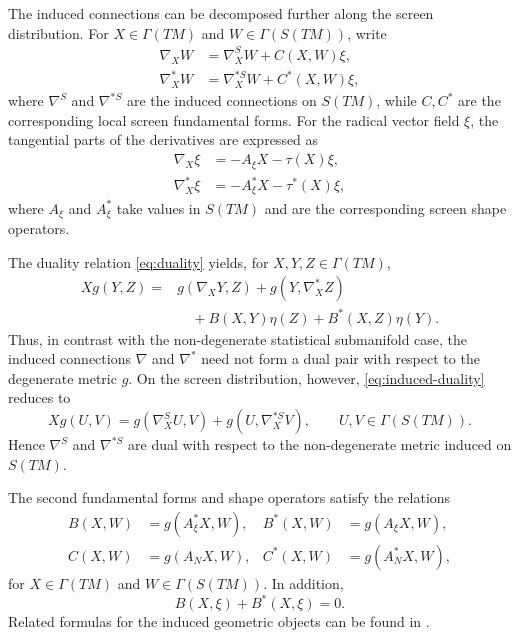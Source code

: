 \documentclass[10pt,a4paper]{amsart}
\begin{document}
The induced connections can be decomposed further along the screen
distribution. For $X\in\Gamma(TM)$ and $W\in\Gamma(S(TM))$, write
\begin{align}
\nabla_{X}W
&=
\nabla^{S}_{X}W+C(X,W)\xi,
\label{eq:screen-gauss}\\
\nabla^{*}_{X}W
&=
\nabla^{*S}_{X}W+C^{*}(X,W)\xi,
\label{eq:screen-gauss-star}
\end{align}
where $\nabla^{S}$ and $\nabla^{*S}$ are the induced connections on $S(TM)$,
while $C,C^{*}$ are the corresponding local screen fundamental forms.
For the radical vector field $\xi$, the tangential parts of the
derivatives are expressed as
\begin{align}
\nabla_{X}\xi
&=
-A_{\xi}X-\tau(X)\xi,
\label{eq:xi-derivative}\\
\nabla^{*}_{X}\xi
&=
-A^{*}_{\xi}X-\tau^{*}(X)\xi,
\label{eq:xi-derivative-star}
\end{align}
where $A_{\xi}$ and $A^{*}_{\xi}$ take values in $S(TM)$ and are the
corresponding screen shape operators.

The duality relation \eqref{eq:duality} yields, for
$X,Y,Z\in\Gamma(TM)$,
\begin{align}
Xg(Y,Z)
={}&
g(\nabla_{X}Y,Z)
+
g(Y,\nabla^{*}_{X}Z) \nonumber\\
&\quad
+B(X,Y)\eta(Z)
+
B^{*}(X,Z)\eta(Y).
\label{eq:induced-duality}
\end{align}
Thus, in contrast with the non-degenerate statistical submanifold case,
the induced connections $\nabla$ and $\nabla^{*}$ need not form a dual
pair with respect to the degenerate metric $g$. On the screen
distribution, however, \eqref{eq:induced-duality} reduces to
\begin{equation}\label{eq:screen-duality}
Xg(U,V)
=
g(\nabla^{S}_{X}U,V)
+
g(U,\nabla^{*S}_{X}V),
\qquad
U,V\in\Gamma(S(TM)).
\end{equation}
Hence $\nabla^{S}$ and $\nabla^{*S}$ are dual with respect to the
non-degenerate metric induced on $S(TM)$.

The second fundamental forms and shape operators satisfy the relations
\begin{align}
B(X,W)
&=
g(A^{*}_{\xi}X,W),
&
B^{*}(X,W)
&=
g(A_{\xi}X,W),
\label{eq:B-shape}\\
C(X,W)
&=
g(A_{N}X,W),
&
C^{*}(X,W)
&=
g(A^{*}_{N}X,W),
\label{eq:C-shape}
\end{align}
for $X\in\Gamma(TM)$ and $W\in\Gamma(S(TM))$. In addition,
\begin{equation}\label{eq:B-xi}
B(X,\xi)+B^{*}(X,\xi)=0.
\end{equation}
Related formulas for the induced geometric objects can be found in
\cite{JainSinghKumar2020,KazemiSalahvarzi2020,RaniKaur2021,
BahadirTripathi2023}.
\end{document}
